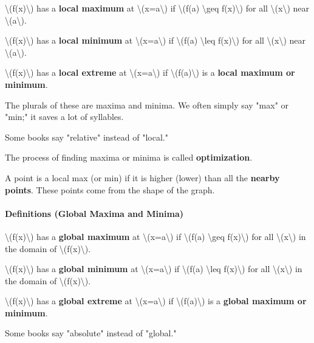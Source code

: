 \textbackslash{}(f(x)\textbackslash{}) has a \textbf{local maximum} at
\textbackslash{}(x=a\textbackslash{}) if \textbackslash{}(f(a)
\textbackslash{}geq f(x)\textbackslash{}) for all
\textbackslash{}(x\textbackslash{}) near
\textbackslash{}(a\textbackslash{}).

\textbackslash{}(f(x)\textbackslash{}) has a \textbf{local minimum} at
\textbackslash{}(x=a\textbackslash{}) if \textbackslash{}(f(a)
\textbackslash{}leq f(x)\textbackslash{}) for all
\textbackslash{}(x\textbackslash{}) near
\textbackslash{}(a\textbackslash{}).

\textbackslash{}(f(x)\textbackslash{}) has a \textbf{local extreme} at
\textbackslash{}(x=a\textbackslash{}) if
\textbackslash{}(f(a)\textbackslash{}) is a \textbf{local maximum or
minimum}.

The plurals of these are maxima and minima. We often simply say "max" or
"min;" it saves a lot of syllables.

Some books say "relative" instead of "local."

The process of finding maxima or minima is called \textbf{optimization}.

A point is a local max (or min) if it is higher (lower) than all the
\textbf{nearby points}. These points come from the shape of the graph.

\hypertarget{definitions-global-maxima-and-minima}{%
\paragraph{Definitions (Global Maxima and
Minima)}\label{definitions-global-maxima-and-minima}}

\textbackslash{}(f(x)\textbackslash{}) has a \textbf{global maximum} at
\textbackslash{}(x=a\textbackslash{}) if \textbackslash{}(f(a)
\textbackslash{}geq f(x)\textbackslash{}) for all
\textbackslash{}(x\textbackslash{}) in the domain of
\textbackslash{}(f(x)\textbackslash{}).

\textbackslash{}(f(x)\textbackslash{}) has a \textbf{global minimum} at
\textbackslash{}(x=a\textbackslash{}) if \textbackslash{}(f(a)
\textbackslash{}leq f(x)\textbackslash{}) for all
\textbackslash{}(x\textbackslash{}) in the domain of
\textbackslash{}(f(x)\textbackslash{}).

\textbackslash{}(f(x)\textbackslash{}) has a \textbf{global extreme} at
\textbackslash{}(x=a\textbackslash{}) if
\textbackslash{}(f(a)\textbackslash{}) is a \textbf{global maximum or
minimum}.

Some books say "absolute" instead of "global."


